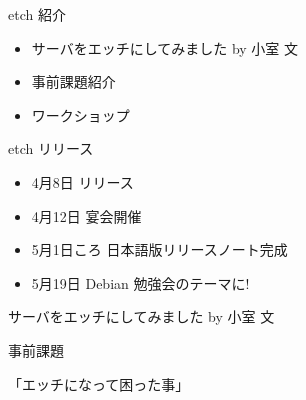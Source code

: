 \documentclass[cjk,dvipdfmx,12pt]{beamer}
\begin{document}
\begin{frame}{etch 紹介}

\begin{itemize}
 \item サーバをエッチにしてみました by 小室 文
 \item 事前課題紹介
 \item ワークショップ
\end{itemize}
\end{frame}

\begin{frame}{etch リリース}
\begin{itemize}
 \item 4月8日 リリース
 \item 4月12日 宴会開催
 \item 5月1日ころ 日本語版リリースノート完成
 \item 5月19日 Debian 勉強会のテーマに!
\end{itemize}
\end{frame}

\begin{frame}{}
サーバをエッチにしてみました by 小室 文
\end{frame}


\begin{frame}

事前課題

「エッチになって困った事」

\end{frame}

\end{document}
